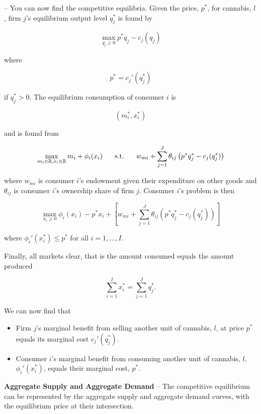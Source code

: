 \documentclass[11pt]{article}
\begin{document}
\newpage
{} -- You can now find the competitive equilibria. Given the price, $p^*$, for cannabis, $l$, firm $j$'s equilibrium output level $q_j^*$ is found by

$$
\max_{q_j \geq 0} p^* q_j - c_j (q_j)
$$

where

$$
p^* = c_j'(q_j^*)
$$

if $q_j^* > 0$. The equilibrium consumption of consumer $i$ is

$$
(m_i^*, x_i^*)
$$

and is found from

$$
\max_{m_i \in \mathbb{R}, x_i \in \mathbb{R}} m_i + \phi_i(x_i) \hspace{4ex}\text{s.t.}\hspace{4ex} w_{mi} + \sum_{j=1}^{J} \theta_{ij}\left(p^*q_j^* - c_j(q_j^*)\right)
$$

where $w_{mi}$ is consumer $i$'s endowment given their expenditure on other goods and $\theta_{ij}$ is consumer $i$'s ownership share of firm $j$. Consumer $i$'s problem is then

$$
\max_{x_i \geq 0 } \phi_i(x_i) - p^*x_i + \left[ w_{mi} + \sum_{j=1}^{J} \theta_{ij}\left(p^*q_j^* - c_j(q_j^*)\right) \right]
$$

where $\phi_i'(x_i^*) \leq p^*$ for all $i=1,\dots,I$.

\vspace{\baselineskip}
Finally, all markets clear, that is the amount consumed equals the amount produced

$$
\sum_{i=1}^I x_i^* = \sum_{j=1}^J q_j^*.
$$

We can now find that

\begin{itemize}

\item Firm $j$'s marginal benefit from selling another unit of cannabis, $l$, at price $p^*$ equals its marginal cost $c_j'(q_j^*)$.

\item Consumer $i$'s marginal benefit from consuming another unit of cannabis, $l$, $\phi_i'(x_i^*)$, equals their marginal cost, $p^*$.

\end{itemize}

\newpage
{\bfseries Aggregate Supply and Aggregate Demand} -- The competitive equilibrium can be represented by the aggregate supply and aggregate demand curves, with the equilibrium price at their intersection.
\end{document}
